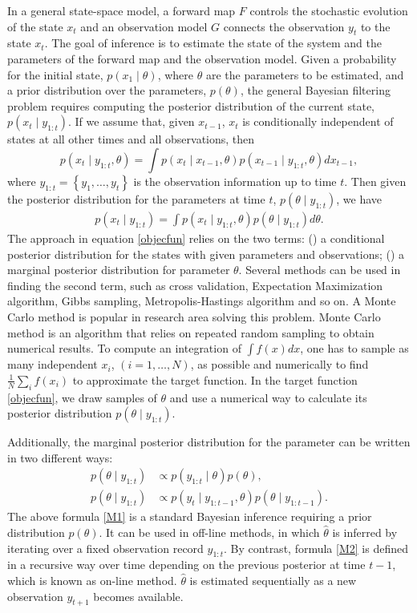 In a general state-space model, a forward map $F$ controls the stochastic evolution of the state $x_t$ and an observation model $G$ connects the observation $y_t$ to the state $x_t$. The goal of inference is to estimate the state of the system and the parameters of the forward map and the observation model. Given a probability for the initial state, $p(x_1\mid \theta)$, where $\theta$ are the parameters to be estimated, and a prior distribution over the parameters, $p(\theta)$, the general Bayesian filtering problem requires computing the posterior distribution of the current state, $p(x_t \mid y_{1:t})$. If we assume that, given $x_{t-1}$, $x_t$ is conditionally independent of states at all other times and all observations, then
\begin{equation}
p(x_t\mid y_{1:t},\theta) = \int p(x_t\mid x_{t-1},\theta)p(x_{t-1}\mid y_{1:t},\theta) dx_{t-1}, 
\end{equation}
where $y_{1:t} = \left\lbrace y_1,\dots,y_t\right\rbrace$ is the observation information up to time $t$. Then given the posterior distribution for the parameters at time $t$, $p(\theta\mid y_{1:t})$, we have 
\begin{align}\label{objecfun}
p(x_t \mid y_{1:t}) = \int p(x_t \mid y_{1:t},\theta)p(\theta\mid y_{1:t})d\theta.
\end{align}
The approach in equation \eqref{objecfun} relies on the two terms: () a conditional posterior distribution for the states with given parameters and observations; () a marginal posterior distribution for parameter $\theta$. Several methods can be used in finding the second term, such as cross validation, Expectation Maximization algorithm, Gibbs sampling, Metropolis-Hastings algorithm and so on. A Monte Carlo method is popular in research area solving this problem. Monte Carlo method is an algorithm that relies on repeated random sampling to obtain numerical results. To compute an integration of $\int f(x)dx$, one has to sample as many independent $x_i$, $(i = 1,\dots, N)$, as possible and numerically to find $\frac{1}{N}\sum_i f(x_i)$ to approximate the target function. In the target function \eqref{objecfun}, we draw samples of $\theta$ and use a numerical way to calculate its posterior distribution $p(\theta\mid y_{1:t})$. 


Additionally, the marginal posterior distribution for the parameter can be written in two different ways: 
\begin{align}\label{M1}
p(\theta \mid y_{1:t}) &\propto p(y_{1:t}\mid\theta)p(\theta),\\
p(\theta \mid y_{1:t}) &\propto p(y_t\mid y_{1:t-1}, \theta)p(\theta\mid y_{1:t-1}). \label{M2}
\end{align}
The above formula \eqref{M1} is a standard Bayesian inference requiring a prior distribution $p(\theta)$. It can be used in off-line methods, in which $\hat{\theta}$ is inferred by iterating over a fixed observation record $y_{1:t}$. By contrast, formula \eqref{M2} is defined in a recursive way over time depending on the previous posterior at time $t-1$, which is known as on-line method. $\hat{\theta}$ is estimated sequentially as a new observation $y_{t+1}$ becomes available. 


